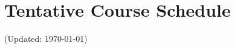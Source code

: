 \documentclass[12pt]{article}
\begin{document}



\section*{Tentative Course Schedule}

(Updated: \today)
\end{document}
